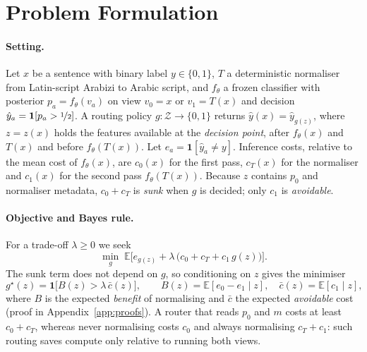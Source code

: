 \section{Problem Formulation}
\label{sec:formulation}

\paragraph{Setting.}
Let $x$ be a sentence with binary label $y\in\{0,1\}$, $T$ a deterministic normaliser from Latin-script Arabizi to Arabic script, and $f_\theta$ a frozen classifier with posterior $p_a=f_\theta(v_a)$ on view $v_0=x$ or $v_1=T(x)$ and decision $\hat y_a=\mathbf 1[p_a>\nicefrac12]$. A routing policy $g:\mathcal Z\to\{0,1\}$ returns $\hat y(x)=\hat y_{g(z)}$, where $z=z(x)$ holds the features available at the \emph{decision point}, after $f_\theta(x)$ and $T(x)$ and before $f_\theta(T(x))$. Let $e_a=\mathbf 1[\hat y_a\neq y]$. Inference costs, relative to the mean cost of $f_\theta(x)$, are $c_0(x)$ for the first pass, $c_T(x)$ for the normaliser and $c_1(x)$ for the second pass $f_\theta(T(x))$. Because $z$ contains $p_0$ and normaliser metadata, $c_0+c_T$ is \emph{sunk} when $g$ is decided; only $c_1$ is \emph{avoidable}.

\paragraph{Objective and Bayes rule.}
For a trade-off $\lambda\ge0$ we seek
\begin{equation}
\min_g\;\mathbb E\big[e_{g(z)}+\lambda\,\big(c_0+c_T+c_1\,g(z)\big)\big].
\label{eq:risk}
\end{equation}
The sunk term does not depend on $g$, so conditioning on $z$ gives the minimiser
\begin{equation}
g^\star(z)=\mathbf 1\big[B(z)>\lambda\,\bar c(z)\big],\qquad B(z)=\mathbb E[e_0-e_1\mid z],\quad \bar c(z)=\mathbb E[c_1\mid z],
\label{eq:bayes}
\end{equation}
where $B$ is the expected \emph{benefit} of normalising and $\bar c$ the expected \emph{avoidable} cost (proof in Appendix~\ref{app:proofs}). A router that reads $p_0$ and $m$ costs at least $c_0+c_T$, whereas never normalising costs $c_0$ and always normalising $c_T+c_1$: such routing saves compute only relative to running both views.

